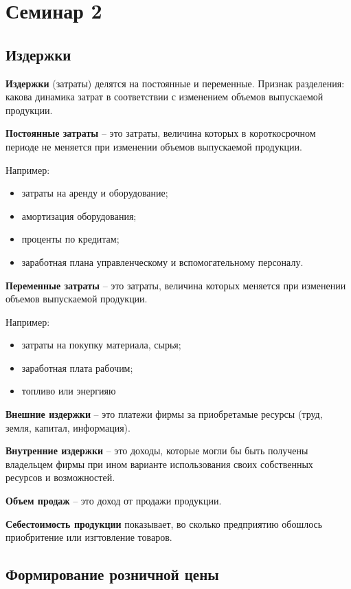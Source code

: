 \section{Семинар 2}

\subsection{Издержки}

\textbf{Издержки} (затраты) делятся на постоянные и переменные. Признак разделения: какова динамика затрат в соответствии с изменением объемов выпускаемой продукции.

\textbf{Постоянные затраты} -- это затраты, величина которых в короткосрочном периоде не меняется при изменении объемов выпускаемой продукции.

Например:

\begin{itemize}
    \item затраты на аренду и оборудование;
    \item амортизация оборудования;
    \item проценты по кредитам;
    \item заработная плана управленческому и вспомогательному персоналу.
\end{itemize}

\textbf{Переменные затраты} -- это затраты, величина которых меняется при изменении объемов выпускаемой продукции.

Например:

\begin{itemize}
    \item затраты на покупку материала, сырья;
    \item заработная плата рабочим;
    \item топливо или энергияю
\end{itemize}

\textbf{Внешние издержки} -- это платежи фирмы за приобретамые ресурсы (труд, земля, капитал, информация).

\textbf{Внутренние издержки} -- это доходы, которые могли бы быть получены владельцем фирмы при ином варианте использования своих собственных ресурсов и возможностей.

\textbf{Объем продаж} -- это доход от продажи продукции.

\textbf{Себестоимость продукции} показывает, во сколько предприятию обошлось приобритение или изгтовление товаров.

\subsection{Формирование розничной цены}

